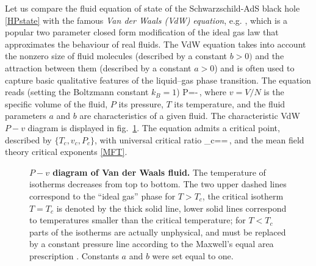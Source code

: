 Let us compare the fluid equation of state of the Schwarzschild-AdS black hole \eqref{HPstate} with the famous {\em Van der Waals (VdW) equation}, e.g. \cite{Goldenfeld:1992},  which is a popular two parameter closed form modification of the ideal gas law that approximates the behaviour of real fluids. The VdW equation takes into account the nonzero size of fluid molecules 
(described by a constant $b>0)$ and the attraction between them (described by a constant $a>0$) and is often used to capture basic qualitative features of the liquid--gas phase transition. The equation reads (setting the Boltzmann constant $k_B=1$)
\be\label{VdW}
P=-\,,
\ee
where $v=V/N$ is the specific volume of the fluid, $P$ its pressure, $T$ its temperature, and the fluid parameters $a$ and $b$ are characteristics 
of a given fluid. The characteristic VdW $P-v$ diagram is displayed in fig.~\ref{fig:PVVdWstate}.
The equation admits a critical point, described by $\{T_c, v_c, P_c\}$, with universal critical ratio 
\be\label{universalVdWratio}
\rho_c==\,,
\ee
and the mean field theory critical exponents \eqref{MFT}.
\begin{figure}\label{fig:Fig1}
\begin{center}
\caption{{\bf $P-v$ diagram of Van der Waals fluid.} The temperature of isotherms decreases from top to bottom. The two upper dashed lines correspond to the ``ideal gas'' phase for $T>T_c$, the critical isotherm $T=T_c$ is denoted by the thick solid line, lower solid lines correspond to temperatures smaller than the critical temperature; for $T<T_c$ parts of the isotherms are actually unphysical, and must be replaced by a constant pressure line according to the Maxwell's equal area prescription \cite{KubiznakMann:2012}. Constants $a$ and $b$ were set equal to one.  
}  \label{fig:PVVdWstate}
\end{center}
\end{figure} 

